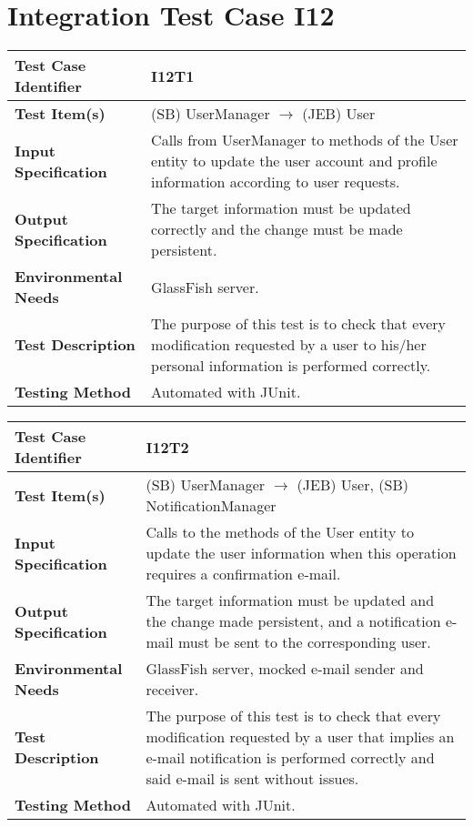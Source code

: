 \section{Integration Test Case I12}

\begin{longtable}{p{} | p{}}
\textbf{Test Case Identifier} & I12T1\\
\hline
\textbf{Test Item(s)} & (SB) UserManager $\rightarrow$ (JEB) User \\
\hline
\textbf{Input Specification} & Calls from UserManager to methods of the User entity to update the user account and profile information according to user requests. \\
\hline
\textbf{Output Specification} & The target information must be updated correctly and the change must be made persistent. \\
\hline
\textbf{Environmental Needs} & GlassFish server. \\
\hline
\textbf{Test Description} & The purpose of this test is to check that every modification requested by a user to his/her personal information is performed correctly. \\
\hline
\textbf{Testing Method} & Automated with JUnit. \\
\hline
\end{longtable}

\begin{longtable}{p{} | p{}}
\textbf{Test Case Identifier} & I12T2\\
\hline
\textbf{Test Item(s)} & (SB) UserManager $\rightarrow$ (JEB) User, (SB) NotificationManager \\
\hline
\textbf{Input Specification} & Calls to the methods of the User entity to update the user information when this operation requires a confirmation e-mail. \\
\hline
\textbf{Output Specification} & The target information must be updated and the change made persistent, and a notification e-mail must be sent to the corresponding user. \\
\hline
\textbf{Environmental Needs} & GlassFish server, mocked e-mail sender and receiver. \\
\hline
\textbf{Test Description} & The purpose of this test is to check that every modification requested by a user that implies an e-mail notification is performed correctly and said e-mail is sent without issues. \\
\hline
\textbf{Testing Method} & Automated with JUnit. \\
\hline
\end{longtable}

